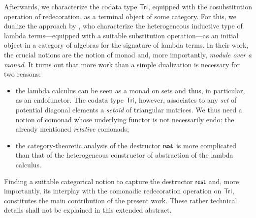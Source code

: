 \documentclass{easychair}
\begin{document}
 Afterwards, we characterize the codata type $\mathsf{Tri}$, equipped with the cosubstitution operation of redecoration, as a terminal object of some category.
 For this, we dualize the approach by \textcite{DBLP:journals/iandc/HirschowitzM10},
 who characterize the heterogeneous inductive type of lambda terms---equipped with a suitable substitution operation---as an initial object in
 a category of algebras for the signature of lambda terms.
 In their work, the crucial notions are the notion of monad and, more importantly, \emph{module over a monad}.
 It turns out that more work than a simple dualization is necessary for two reasons:
 \begin{itemize}
  \item the lambda calculus can be seen as a monad on sets and thus, in particular, as an endofunctor.
        The codata type $\mathsf{Tri}$, however, associates to any \emph{set} of potential diagonal elements a \emph{setoid}
        of triangular matrices. We thus need a notion of comonad whose underlying functor is not necessarily endo: the 
        already mentioned \emph{relative} comonads;
  \item the category-theoretic analysis of the destructor $\mathsf{rest}$ is more complicated than that of the heterogeneous 
           constructor of abstraction of the lambda calculus.
 \end{itemize}
 Finding a suitable categorical notion to capture the destructor $\mathsf{rest}$ and, more importantly, its interplay with
 the comonadic redecoration operation on $\mathsf{Tri}$, constitutes the main contribution of the present work.
 These rather technical details shall not be explained in this extended abstract.
 
 
\end{document}
